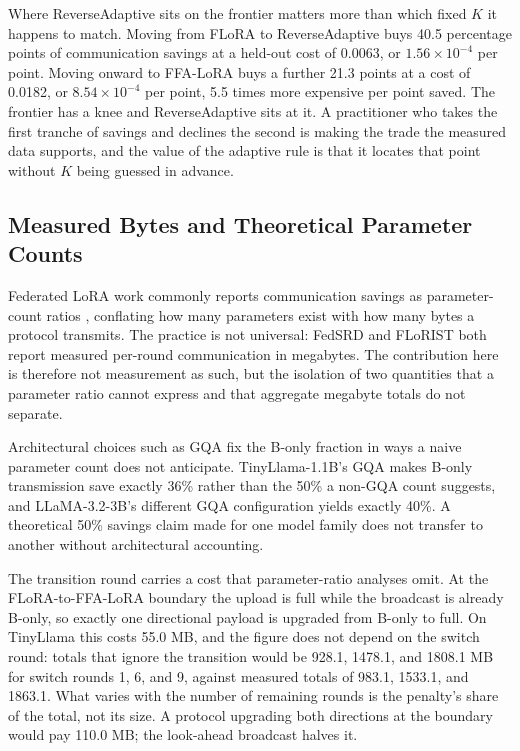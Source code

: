 Where ReverseAdaptive sits on the frontier matters more than which fixed $K$ it happens to match. Moving from FLoRA to ReverseAdaptive buys 40.5 percentage points of communication savings at a held-out cost of 0.0063, or $1.56 \times 10^{-4}$ per point. Moving onward to FFA-LoRA buys a further 21.3 points at a cost of 0.0182, or $8.54 \times 10^{-4}$ per point, 5.5 times more expensive per point saved. The frontier has a knee and ReverseAdaptive sits at it. A practitioner who takes the first tranche of savings and declines the second is making the trade the measured data supports, and the value of the adaptive rule is that it locates that point without $K$ being guessed in advance.

\subsection{Measured Bytes and Theoretical Parameter Counts}
Federated LoRA work commonly reports communication savings as parameter-count ratios \citep{zhang2024federatedgpt,sun2024ffalora,wang2024flora,bai2024flexlora}, conflating how many parameters exist with how many bytes a protocol transmits. The practice is not universal: FedSRD \citep{yan2026fedsrd} and FLoRIST \citep{ramesh2026florist} both report measured per-round communication in megabytes. The contribution here is therefore not measurement as such, but the isolation of two quantities that a parameter ratio cannot express and that aggregate megabyte totals do not separate.

Architectural choices such as GQA fix the B-only fraction in ways a naive parameter count does not anticipate. TinyLlama-1.1B's GQA makes B-only transmission save exactly 36\% rather than the 50\% a non-GQA count suggests, and LLaMA-3.2-3B's different GQA configuration yields exactly 40\%. A theoretical 50\% savings claim made for one model family does not transfer to another without architectural accounting.

The transition round carries a cost that parameter-ratio analyses omit. At the FLoRA-to-FFA-LoRA boundary the upload is full while the broadcast is already B-only, so exactly one directional payload is upgraded from B-only to full. On TinyLlama this costs 55.0 MB, and the figure does not depend on the switch round: totals that ignore the transition would be 928.1, 1478.1, and 1808.1 MB for switch rounds 1, 6, and 9, against measured totals of 983.1, 1533.1, and 1863.1. What varies with the number of remaining rounds is the penalty's share of the total, not its size. A protocol upgrading both directions at the boundary would pay 110.0 MB; the look-ahead broadcast halves it.

